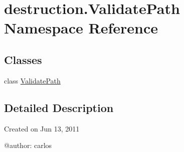 \hypertarget{namespacedestruction_1_1_validate_path}{\section{destruction.\-Validate\-Path Namespace Reference}
\label{namespacedestruction_1_1_validate_path}
}
\subsection*{Classes}
\begin{DoxyCompactItemize}
\item 
class \hyperlink{classdestruction_1_1_validate_path_1_1_validate_path}{Validate\-Path}
\end{DoxyCompactItemize}


\subsection{Detailed Description}
\begin{DoxyVerb}Created on Jun 13, 2011

@author: carlos
\end{DoxyVerb}
 